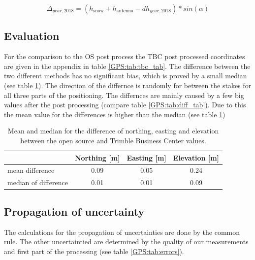 \begin{equation}
	\Delta_{year,2018} = (h_{\text{snow}} + h_{\text{antenna}} - dh_{year,2018}) * sin(\alpha)
\end{equation}

\subsection{Evaluation}
For the comparison to the OS post process the TBC post processed coordinates are given in the appendix in table \ref{GPS:tab:tbc_tab}.
The difference between the two different methods has no significant bias, which is proved by a small median (see table \ref{GPS:tab:diff}).
The direction of the differnce is randomly for between the stakes for all three parts of the positioning.
The differnces are mainly caused by a few big values after the post processing (compare table \ref{GPS:tab:diff_tab}).
Due to this the mean value for the differences is higher than the median (see table \ref{GPS:tab:diff}) 

\begin{table}[H]
	\caption{Mean and median for the difference of northing, easting and elevation between the open source and Trimble Business Center values.}
	\centering
	\begin{tabular}{lccc}
	\toprule         
      &  Northing [m] & Easting [m] & Elevation [m] \\
	\midrule
    mean difference &  0.09 & 0.05 & 0.24 \\
    median of difference & 0.01 & 0.01 & 0.09 \\
    \bottomrule
	\end{tabular}
	\label{GPS:tab:diff}
\end{table}

\subsection{Propagation of uncertainty}

The calculations for the propagation of uncertainties are done by the common rule.
The other uncertaintied are determined by the quality of our measurements and first part of the processing (see table \ref{GPS:tab:errors}).

